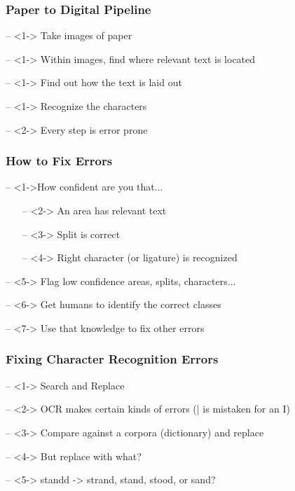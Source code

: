 \documentclass[compress, black]{beamer}
\begin{document}
\begin{frame}
\frametitle{Paper to Digital Pipeline}
	\begin{large_enum}
		\item[--]<1-> Take images of paper
		\item[--]<1-> Within images, find where \alert{relevant} text is located
		\item[--]<1-> Find out how the text is laid out
		\item[--]<1-> Recognize the characters
		\item[--]<2-> \alert{Every step is error prone} 
	\end{large_enum}
\end{frame}

\begin{frame}
\end{frame}
\begin{frame}
\frametitle{How to Fix Errors}
	\begin{large_enum}
		\item[--]<1->How confident are you that...
		\begin{enumerate}
			\item[--]<2-> An area has \alert{relevant} text
			\item[--]<3-> Split is correct
			\item[--]<4-> Right character (or ligature) is recognized 		
		\end{enumerate}
		\item[--]<5-> Flag low confidence areas, splits, characters...
		\item[--]<6-> Get humans to identify the correct classes
		\item[--]<7-> Use that knowledge to fix other errors
	   \end{large_enum}
\end{frame}

\begin{frame}
\frametitle{Fixing Character Recognition Errors}
	\begin{large_enum}
		\item[--]<1-> Search and Replace
		\item[--]<2-> OCR makes certain kinds of errors (| is mistaken for an I) 
		\item[--]<3-> Compare against a corpora (dictionary) and replace 
		\item[--]<4-> But replace with what?
		\item[--]<5-> standd -> strand, stand, stood, or sand?
	\end{large_enum}
\end{frame}
\end{document}

